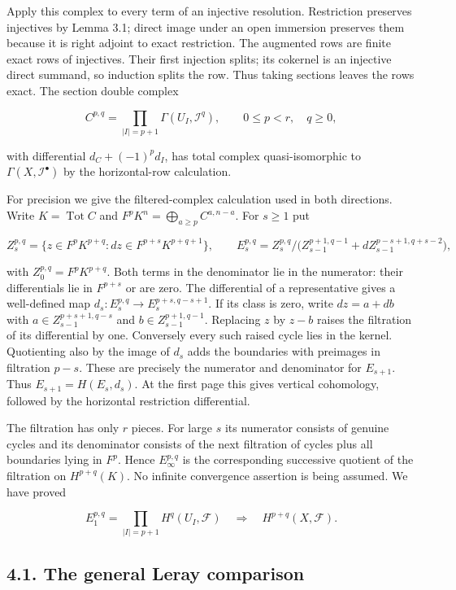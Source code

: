 \documentclass[11pt,a4paper,openany]{report}
\begin{document}
Apply this complex to every term of an injective resolution. Restriction preserves injectives by Lemma 3.1; direct image under an open immersion preserves them because it is right adjoint to exact restriction. The augmented rows are finite exact rows of injectives. Their first injection splits; its cokernel is an injective direct summand, so induction splits the row. Thus taking sections leaves the rows exact. The section double complex

\[
C^{p,q}=\prod_{|I|=p+1}\Gamma(U_I,\mathcal I^q),
\qquad 0\le p<r,\quad q\ge0,
\]

with differential \(d_C+(-1)^pd_I\), has total complex quasi-isomorphic to \(\Gamma(X,\mathcal I^\bullet)\) by the horizontal-row calculation.

For precision we give the filtered-complex calculation used in both directions. Write \(K=\operatorname{Tot}C\) and \(F^pK^n=\bigoplus_{a\ge p}C^{a,n-a}\). For \(s\ge1\) put

\[
Z_s^{p,q}=\{z\in F^pK^{p+q}:dz\in F^{p+s}K^{p+q+1}\},
\qquad
E_s^{p,q}=Z_s^{p,q}/\bigl(Z_{s-1}^{p+1,q-1}+dZ_{s-1}^{p-s+1,q+s-2}\bigr),
\]

with \(Z_0^{p,q}=F^pK^{p+q}\). Both terms in the denominator lie in the numerator: their differentials lie in \(F^{p+s}\) or are zero. The differential of a representative gives a well-defined map \(d_s:E_s^{p,q}\to E_s^{p+s,q-s+1}\). If its class is zero, write \(dz=a+db\) with \(a\in Z_{s-1}^{p+s+1,q-s}\) and \(b\in Z_{s-1}^{p+1,q-1}\). Replacing \(z\) by \(z-b\) raises the filtration of its differential by one. Conversely every such raised cycle lies in the kernel. Quotienting also by the image of \(d_s\) adds the boundaries with preimages in filtration \(p-s\). These are precisely the numerator and denominator for \(E_{s+1}\). Thus \(E_{s+1}=H(E_s,d_s)\). At the first page this gives vertical cohomology, followed by the horizontal restriction differential.

The filtration has only \(r\) pieces. For large \(s\) its numerator consists of genuine cycles and its denominator consists of the next filtration of cycles plus all boundaries lying in \(F^p\). Hence \(E_\infty^{p,q}\) is the corresponding successive quotient of the filtration on \(H^{p+q}(K)\). No infinite convergence assertion is being assumed. We have proved

\[
E_1^{p,q}=\prod_{|I|=p+1}H^q(U_I,\mathcal F)
\quad\Longrightarrow\quad H^{p+q}(X,\mathcal F).
\]

\subsection{4.1. The general Leray comparison}\label{AG-RG-S01-the-general-leray-comparison}
\end{document}
